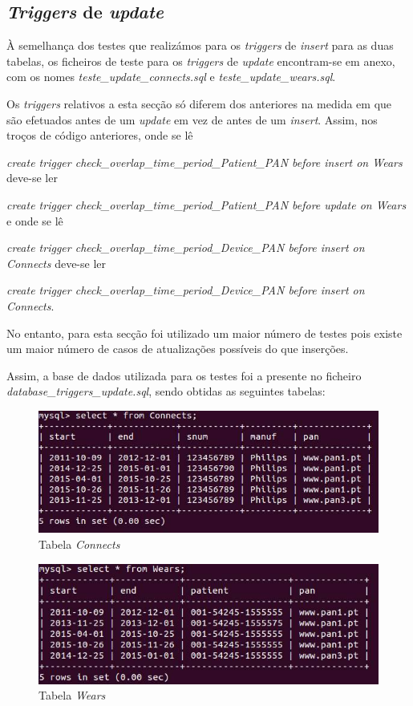 \documentclass[a4paper]{article}
\begin{document}
\subsection{\textit{Triggers} de \textit{update}}
À semelhança dos testes que realizámos para os \textit{triggers} de \textit{insert} para as duas tabelas, os ficheiros de teste para os \textit{triggers} de \textit{update} encontram-se em anexo, com os nomes \textit{teste\_update\_connects.sql} e \textit{teste\_update\_wears.sql}.

Os \textit{triggers} relativos a esta secção só diferem dos anteriores na medida em que são efetuados antes de um \textit{update} em vez de antes de um \textit{insert}. Assim, nos troços de código anteriores, onde se lê 

\textit{create trigger check\_overlap\_time\_period\_Patient\_PAN before insert on Wears} deve-se ler

 \textit{create trigger check\_overlap\_time\_period\_Patient\_PAN before update on Wears} e onde se lê
 
  \textit{create trigger check\_overlap\_time\_period\_Device\_PAN before insert on Connects} deve-se ler
  
   \textit{create trigger check\_overlap\_time\_period\_Device\_PAN before insert on Connects}.

No entanto, para esta secção foi utilizado um maior número de testes pois existe um maior número de casos de atualizações possíveis do que inserções.

Assim, a base de dados utilizada para os testes foi a presente no ficheiro \textit{database\_triggers\_update.sql}, sendo obtidas as seguintes tabelas:

\begin{figure}[ht!]
\centering
\includegraphics[scale=0.5]{update_connects.jpg}
\caption{Tabela \textit{Connects}}
\end{figure}

\begin{figure}[ht!]
\centering
\includegraphics[scale=0.5]{update_wears.jpg}
\caption{Tabela \textit{Wears}}
\end{figure}
\end{document}
